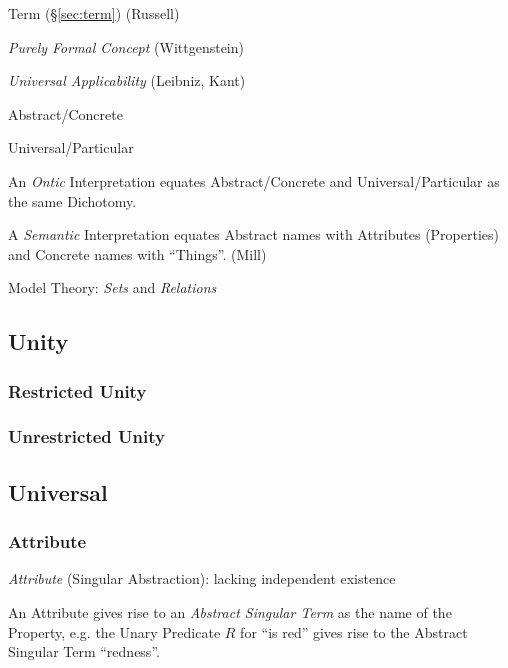 Term (\S\ref{sec:term}) (Russell)

\emph{Purely Formal Concept} (Wittgenstein)

\emph{Universal Applicability} (Leibniz, Kant)

Abstract/Concrete

Universal/Particular

An \emph{Ontic} Interpretation equates Abstract/Concrete and
Universal/Particular as the same Dichotomy.

A \emph{Semantic} Interpretation equates Abstract names with
Attributes (Properties) and Concrete names with ``Things''. (Mill)

Model Theory: \emph{Sets} and \emph{Relations}



\subsection{Unity}\label{sec:unity}

\subsubsection{Restricted Unity}\label{sec:restricted_unity}

\subsubsection{Unrestricted Unity}\label{sec:unrestricted_unity}



\subsection{Universal}\label{sec:universal}

\subsubsection{Attribute}\label{sec:attribute}

\emph{Attribute} (Singular Abstraction): lacking independent existence

An Attribute gives rise to an \emph{Abstract Singular Term} as the name
of the Property, e.g. the Unary Predicate $R$ for ``is red'' gives
rise to the Abstract Singular Term ``redness''. \cite{laycock10}

